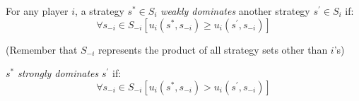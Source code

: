 \documentclass[12pt]{article}
\begin{document}
For any player $i$, a strategy $s^*\in S_i$ \emph{weakly dominates} another strategy $s^\prime\in S_i$ if:
\begin{displaymath}
\forall s_{-i}\in S_{-i}\left[u_i(s^*,s_{-i})\geq u_i(s^\prime,s_{-i})\right]
\end{displaymath}

(Remember that $S_{-i}$ represents the product of all strategy sets other than $i$'s)

$s^*$ \emph{strongly dominates} $s^\prime$ if:
\begin{displaymath}
\forall s_{-i}\in S_{-i}\left[u_i(s^*,s_{-i})> u_i(s^\prime,s_{-i})\right]
\end{displaymath}
\end{document}
